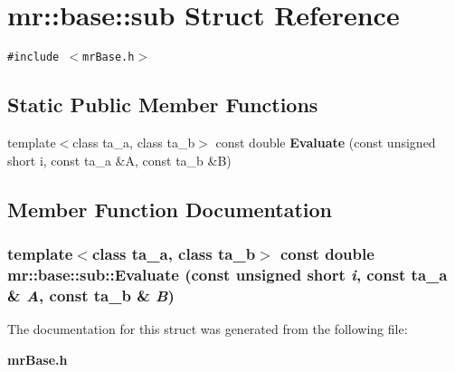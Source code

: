 \section{mr::base::sub Struct Reference}
\label{structmr_1_1base_1_1sub}
{\tt \#include $<$mr\-Base.h$>$}

\subsection*{Static Public Member Functions}
\begin{CompactItemize}
\item 
template$<$class ta\_\-a, class ta\_\-b$>$ const double {\bf Evaluate} (const unsigned short i, const ta\_\-a \&A, const ta\_\-b \&B)
\end{CompactItemize}


\subsection{Member Function Documentation}
\subsubsection{\setlength{\rightskip}{0pt plus 5cm}template$<$class ta\_\-a, class ta\_\-b$>$ const double mr::base::sub::Evaluate (const unsigned short {\em i}, const ta\_\-a \& {\em A}, const ta\_\-b \& {\em B})\hspace{0.3cm}{\tt  [inline, static]}}\label{structmr_1_1base_1_1sub_e0}




The documentation for this struct was generated from the following file:\begin{CompactItemize}
\item 
{\bf mr\-Base.h}\end{CompactItemize}
